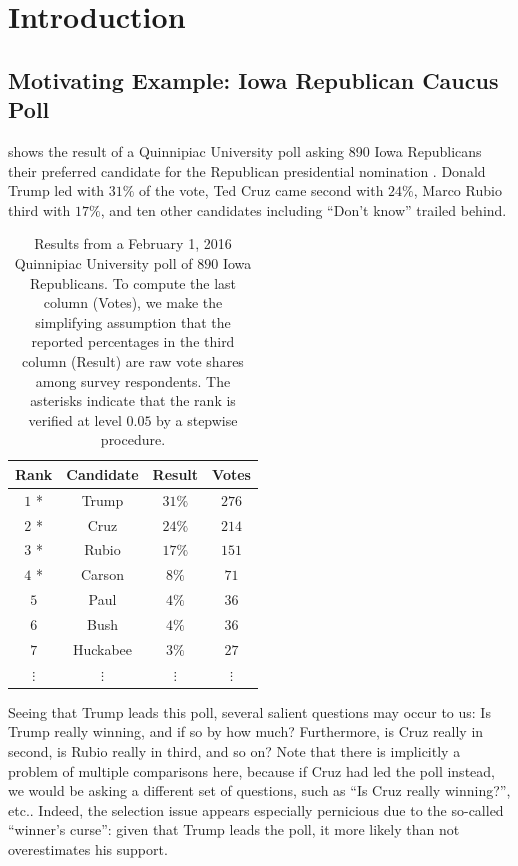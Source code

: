 \documentclass[aos, authoryear]{imsart}
\theoremstyle{definition}
\theoremstyle{custom}
\begin{document}
\section{Introduction}
\label{sec:intro}

\subsection{Motivating Example: Iowa Republican Caucus Poll}
\label{sec:iowa}

 shows the result of a Quinnipiac University poll asking 890 Iowa Republicans their preferred candidate for the Republican presidential nomination \citep{quinnipiac}. Donald Trump led with $31\%$ of the vote, Ted Cruz came second with $24\%$, Marco Rubio third with $17\%$, and ten other candidates including ``Don't know'' trailed behind. 

\begin{table}[htbp]
\centering
\begin{tabular}{c c c c}
	\hline
	Rank & Candidate & Result & Votes \\
	\hline
	$1$ * & Trump & $31\%$ & $276$ \\
	$2$ * & Cruz & $24\%$ & $214$ \\
	$3$ * & Rubio & $17\%$ & $151$ \\
	$4$ * & Carson & $8\%$ & $71$ \\
	$5$ & Paul & $4\%$ & $36$ \\
	$6$ & Bush & $4\%$ & $36$ \\
	$7$ & Huckabee & $3\%$ & $27$ \\
	$\vdots$ & $\vdots$ & $\vdots $ & $\vdots$ \\
	\hline
\end{tabular}
\caption{Results from a February 1, 2016 Quinnipiac University poll of $890$ Iowa Republicans. To compute the last column (Votes), we make the simplifying assumption that the reported percentages in the third column (Result) are raw vote shares among survey respondents. The asterisks indicate that the rank is verified at level $0.05$ by a stepwise procedure.}
\label{tbl:poll}
\end{table}

Seeing that Trump leads this poll, several salient questions may occur to us: Is Trump really winning, and if so by how much? Furthermore, is Cruz really in second, is Rubio really in third, and so on? Note that there is implicitly a problem of multiple comparisons here, because if Cruz had led the poll instead, we would be asking a different set of questions, such as ``Is Cruz really winning?'', etc.. Indeed, the selection issue appears especially pernicious due to the so-called ``winner's curse'': given that Trump leads the poll, it more likely than not overestimates his support.
\end{document}
